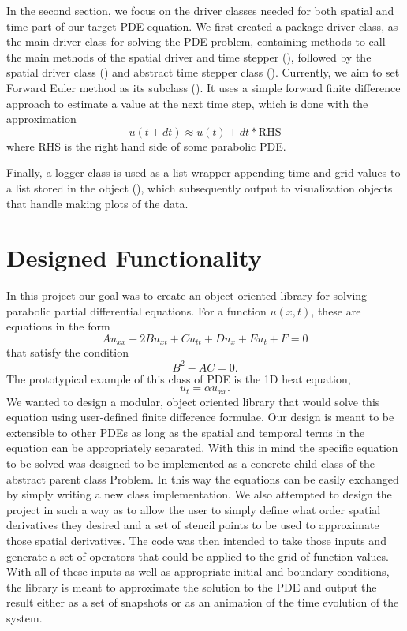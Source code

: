\documentclass{article}
\begin{document}
	In the second section, we focus on the driver classes needed for both spatial and time part of our target PDE equation. We first created a package driver class, as the main driver class for solving the PDE problem, containing methods to call the main methods of the spatial driver and time stepper (), followed by the spatial driver class () and abstract time stepper class (). Currently, we aim to set Forward Euler method as its subclass (). It uses a simple forward finite difference approach to estimate a value at the next time step, which is done with the approximation 
	\begin{equation}
		u(t+dt) \approx u(t) + dt*\text{RHS}
	\end{equation}
	where RHS is the right hand side of some parabolic PDE.

	Finally, a logger class is used as a list wrapper appending time and grid values to a list stored in the object (), which subsequently output to visualization objects that handle making plots of the data.

	\section{Designed Functionality}
	In this project our goal was to create an object oriented library for solving parabolic partial differential equations. For a function $u(x,t)$, these are equations in the form 
	\begin{equation}
	A u_{xx} + 2B u_{xt} + C u_{tt} + Du_x + Eu_t + F = 0 
	\end{equation}
	that satisfy the condition 
	\begin{equation}
	B^2 - AC = 0.
	\end{equation} The prototypical example of this class of PDE is the 1D heat equation, 
	\begin{equation}
	u_t = \alpha u_{xx}.
	\end{equation}
	We wanted to design a modular, object oriented library that would solve this equation using user-defined finite difference formulae. Our design is meant to be extensible to other PDEs as long as the spatial and temporal terms in the equation can be appropriately separated. With this in mind the specific equation to be solved was designed to be implemented as a concrete child class of the abstract parent class Problem. In this way the equations can be easily exchanged by simply writing a new class implementation. We also attempted to design the project in such a way as to allow the user to simply define what order spatial derivatives they desired and a set of stencil points to be used to approximate those spatial derivatives. The code was then intended to take those inputs and generate a set of operators that could be applied to the grid of function values. With all of these inputs as well as appropriate initial and boundary conditions, the library is meant to approximate the solution to the PDE and output the result either as a set of snapshots or as an animation of the time evolution of the system.
\end{document}
